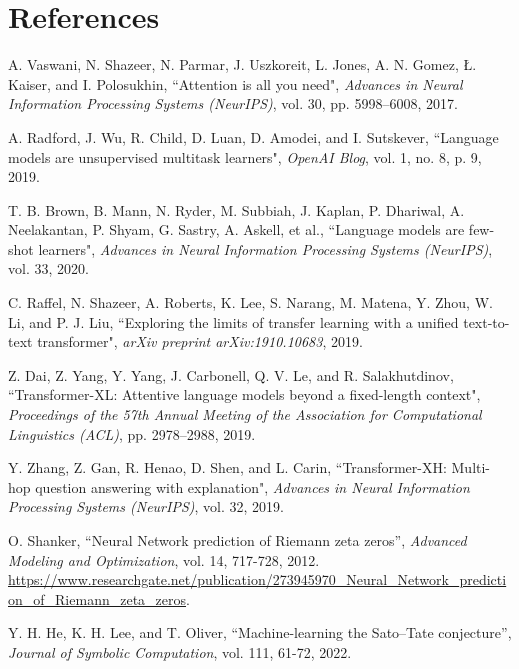 \documentclass[journal]{IEEEtai}
\begin{document}
\section*{References}

\begin{thebibliography}{34}

A. Vaswani, N. Shazeer, N. Parmar, J. Uszkoreit, L. Jones, A. N. Gomez, Ł. Kaiser, and I. Polosukhin, ``Attention is all you need",  \emph{Advances in Neural Information Processing Systems (NeurIPS)}, vol. 30, pp. 5998--6008, 2017.

A. Radford, J. Wu, R. Child, D. Luan, D. Amodei, and I. Sutskever, ``Language models are unsupervised multitask learners", \emph{OpenAI Blog}, vol. 1, no. 8, p. 9, 2019.

T. B. Brown, B. Mann, N. Ryder, M. Subbiah, J. Kaplan, P. Dhariwal, A. Neelakantan, P. Shyam, G. Sastry, A. Askell, et al., ``Language models are few-shot learners",  \emph{Advances in Neural Information Processing Systems (NeurIPS)}, vol. 33, 2020.

C. Raffel, N. Shazeer, A. Roberts, K. Lee, S. Narang, M. Matena, Y. Zhou, W. Li, and P. J. Liu, ``Exploring the limits of transfer learning with a unified text-to-text transformer", \emph{arXiv preprint arXiv:1910.10683}, 2019.

Z. Dai, Z. Yang, Y. Yang, J. Carbonell, Q. V. Le, and R. Salakhutdinov, ``Transformer-XL: Attentive language models beyond a fixed-length context",  \emph{Proceedings of the 57th Annual Meeting of the Association for Computational Linguistics (ACL)}, pp. 2978--2988, 2019.

Y. Zhang, Z. Gan, R. Henao, D. Shen, and L. Carin, ``Transformer-XH: Multi-hop question answering with explanation",  \emph{Advances in Neural Information Processing Systems (NeurIPS)}, vol. 32, 2019.

 O. Shanker, ``Neural Network prediction of Riemann zeta zeros'',
\emph{Advanced Modeling and Optimization}, vol. 14, 717-728, 2012. \url{https://www.researchgate.net/publication/273945970_Neural_Network_prediction_of_Riemann_zeta_zeros}.

 Y. H. He, K. H. Lee, and T. Oliver, ``Machine-learning the Sato–Tate conjecture'', \emph{Journal of Symbolic Computation}, vol. 111, 61-72, 2022.


\end{thebibliography}
\end{document}

